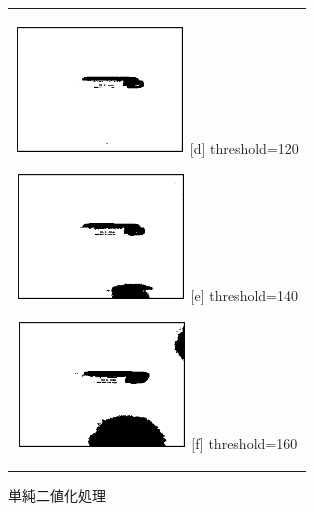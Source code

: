 \documentclass{suribt}
\begin{document}
\begin{figure} [htbp]
\begin{center}
\begin{tabular}{c}
		\begin{minipage}{0.33\hsize}
			\begin{center}
				\includegraphics[clip, width=4.5cm]{./figure/pen_thresh_120.eps}
				\hspace{1.6cm} [d] threshold=120
			\end{center}
		\end{minipage} 
		
		\begin{minipage}{0.33\hsize}
			\begin{center}
				\includegraphics[clip, width=4.5cm]{./figure/pen_thresh_140.eps}
				\hspace{1.6cm} [e] threshold=140
			\end{center}
		\end{minipage} 
		
		\begin{minipage}{0.33\hsize}
			\begin{center}
				\includegraphics[clip, width=4.5cm]{./figure/pen_thresh_160.eps}
				\hspace{1.6cm} [f] threshold=160
			\end{center}
		\end{minipage}

		\end{tabular}
		\caption{単純二値化処理}
		\label{fig:global}
	\end{center}
\end{figure}
\end{document}
